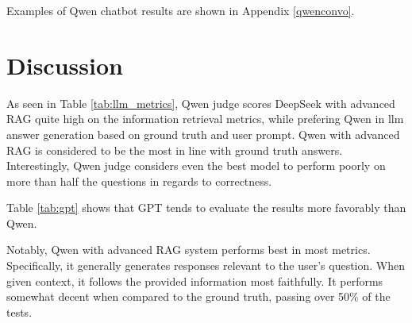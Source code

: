 \documentclass[fleqn,moreauthors,10pt]{ds_report}
\begin{document}
Examples of Qwen chatbot results are shown in Appendix \ref{qwenconvo}.


\section*{Discussion}









As seen in Table \ref{tab:llm_metrics}, Qwen judge scores DeepSeek with advanced RAG quite high on the information retrieval metrics, while prefering Qwen in \ac{llm} answer generation based on ground truth and user prompt. Qwen with advanced RAG is considered to be the most in line with ground truth answers. Interestingly, Qwen judge considers even the best model to perform poorly on more than half the questions in regards to correctness.

Table \ref{tab:gpt} shows that GPT tends to evaluate the results more favorably than Qwen.

Notably, Qwen with advanced RAG system performs best in most metrics. Specifically, it generally generates responses relevant to the user's question. When given context, it follows the provided information most faithfully. It performs somewhat decent when compared to the ground truth, passing over 50\% of the tests.
\end{document}
